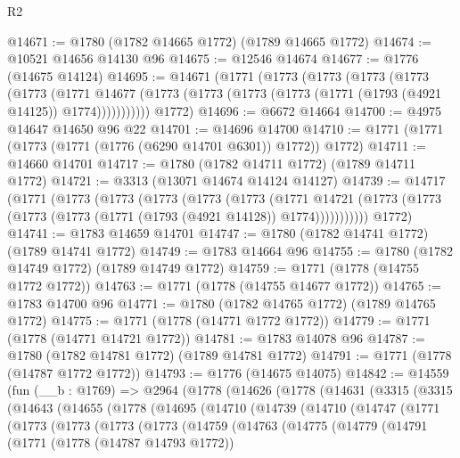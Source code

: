 \begin{lexlean}{R2}
\begin{coremodule}
@14671 := @1780 (@1782 @14665 @1772) (@1789 @14665 @1772)
@14674 := @10521 @14656 @14130 @96
@14675 := @12546 @14674
@14677 := @1776 (@14675 @14124)
@14695 := @14671
    (@1771
      (@1773
        (@1773
          (@1773
            (@1773
              (@1773
                (@1771
                  @14677
                  (@1773 (@1773 (@1773 (@1773 (@1771 (@1793 (@4921 @14125)) @1774)))))))))))
      @1772)
@14696 := @6672 @14664
@14700 := @4975 @14647 @14650 @96 @22
@14701 := @14696 @14700
@14710 := @1771 (@1771 (@1773 (@1771 (@1776 (@6290 @14701 @6301)) @1772)) @1772)
@14711 := @14660 @14701
@14717 := @1780 (@1782 @14711 @1772) (@1789 @14711 @1772)
@14721 := @3313 (@13071 @14674 @14124 @14127)
@14739 := @14717
    (@1771
      (@1773
        (@1773
          (@1773
            (@1773
              (@1773
                (@1771
                  @14721
                  (@1773 (@1773 (@1773 (@1773 (@1771 (@1793 (@4921 @14128)) @1774)))))))))))
      @1772)
@14741 := @1783 @14659 @14701
@14747 := @1780 (@1782 @14741 @1772) (@1789 @14741 @1772)
@14749 := @1783 @14664 @96
@14755 := @1780 (@1782 @14749 @1772) (@1789 @14749 @1772)
@14759 := @1771 (@1778 (@14755 @1772 @1772))
@14763 := @1771 (@1778 (@14755 @14677 @1772))
@14765 := @1783 @14700 @96
@14771 := @1780 (@1782 @14765 @1772) (@1789 @14765 @1772)
@14775 := @1771 (@1778 (@14771 @1772 @1772))
@14779 := @1771 (@1778 (@14771 @14721 @1772))
@14781 := @1783 @14078 @96
@14787 := @1780 (@1782 @14781 @1772) (@1789 @14781 @1772)
@14791 := @1771 (@1778 (@14787 @1772 @1772))
@14793 := @1776 (@14675 @14075)
@14842 := @14559
    (fun (__b : @1769) =>
    @2964
      (@1778
        (@14626
          (@1778
            (@14631
              (@3315
                (@3315
                  (@14643
                    (@14655
                      (@1778
                        (@14695
                          (@14710
                            (@14739
                              (@14710
                                (@14747
                                  (@1771
                                    (@1773
                                      (@1773
                                        (@1773
                                          (@1773
                                            (@14759
                                              (@14763
                                                (@14775
                                                  (@14779
                                                    (@14791
                                                      (@1771
                                                        (@1778 (@14787 @14793 @1772))

\end{coremodule}
\end{lexlean}
